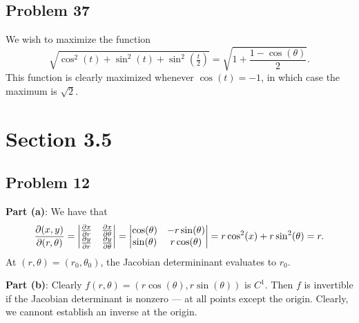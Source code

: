 \documentclass[11pt]{article}
\begin{document}

\subsection*{Problem 37}

We wish to maximize the function
\[
	\sqrt{\cos^{2}(t) + \sin^{2}(t) + \sin^{2} \left( \tfrac{t}{2} \right)} = \sqrt{1 + \frac{1 - \cos(\theta)}{2}}.
\]
This function is clearly maximized whenever $\cos(t) = -1$, in which case the maximum is $\boxed{\sqrt{2}}$.


\section{Section 3.5}


\subsection*{Problem 12}

\textbf{Part (a)}: We have that
\[
	\pdv{(x, y)}{(r, \theta)} = \begin{vmatrix} \pdv{x}{r} & \pdv{x}{\theta} \\ \pdv{y}{r} & \pdv{y}{\theta} \end{vmatrix} = \begin{vmatrix} \cos(\theta) & -r \sin(\theta) \\ \sin(\theta) & r \cos(\theta) \end{vmatrix} = r \cos^{2}(x) + r \sin^{2}(\theta) = r.
\]
At $(r, \theta) = (r_{0}, \theta_{0})$, the Jacobian determininant evaluates to $r_{0}$.

\textbf{Part (b)}: Clearly $f(r, \theta) = (r \cos(\theta), r\sin(\theta))$ is $C^{1}$. Then $f$ is invertible if the Jacobian determinant is nonzero --- at $\boxed{\text{all points except the origin}}$. Clearly, we cannont establish an inverse at the origin.
 
\end{document}
